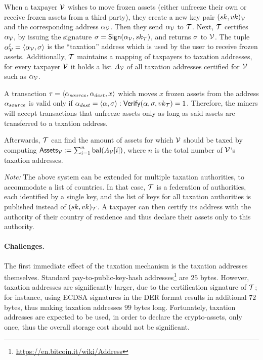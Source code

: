 When a taxpayer $\mathcal{V}$ wishes to move frozen assets (either unfreeze their own
or receive frozen assets from a third party), they create a new key pair
$(sk, vk)_\mathcal{V}$ and the corresponding address $\alpha_\mathcal{V}$. Then they send
$\alpha_\mathcal{V}$ to $\mathcal{T}$. Next, $\mathcal{T}$ certifies $\alpha_\mathcal{V}$, by
issuing the signature $\sigma = \mathsf{Sign}(\alpha_\mathcal{V}, sk_\mathcal{T})$,
and returns $\sigma$ to $\mathcal{V}$. The tuple $\alpha_\mathcal{V}^{t} = \langle
\alpha_\mathcal{V}, \sigma \rangle$ is the ``taxation'' address which is used by the
user to receive frozen assets. Additionally, $\mathcal{T}$ maintains a mapping of
taxpayers to taxation addresses, \ie for every taxpayer $\mathcal{V}$ it holds a list
$A_\mathcal{V}$ of all taxation addresses certified for $\mathcal{V}$ such as
$\alpha_\mathcal{V}$.

A transaction $\tau = \langle \alpha_{source}, \alpha_{dest}, x \rangle$
which moves $x$ frozen assets from the address $\alpha_{source}$ is valid
only if $\alpha_{dest} = \langle \alpha, \sigma \rangle:
\mathsf{Verify}(\alpha, \sigma, vk_\mathcal{T}) = 1$. Therefore, the miners
will accept transactions that unfreeze assets only as long as said assets are
transferred to a taxation address.

Afterwards, $\mathcal{T}$ can find the amount of assets for which $\mathcal{V}$ should
be taxed by computing $\mathsf{Assets}_\mathcal{V} := \sum_{i=1}^{n} \text{bal}(A_{\mathcal{V}}[i])$,
where $n$ is the total number of $\mathcal{V}$'s taxation addresses.

\emph{Note:} The above system can be extended for multiple taxation
authorities, \eg to accommodate a list of countries. In that case, $\mathcal{T}$
is a federation of authorities, each identified by a single key, and
the list of keys for all taxation authorities is published instead of
$(sk, vk)_\mathcal{T}$. A taxpayer can then certify its address with the authority
of their country of residence and thus declare their assets only to this
authority.

\paragraph{Challenges.}

The first immediate effect of the taxation mechanism is the taxation addresses
themselves. Standard pay-to-public-key-hash
addresses\footnote{\url{https://en.bitcoin.it/wiki/Address}} are $25$ bytes.
However, taxation addresses are significantly larger, due to the certification
signature of $\mathcal{T}$; for instance, using ECDSA signatures in the DER format
results in additional $72$ bytes, thus making taxation addresses $99$ bytes
long. Fortunately, taxation addresses are expected to be used, in order to
declare the crypto-assets, only once, thus the overall storage cost should not
be significant.

